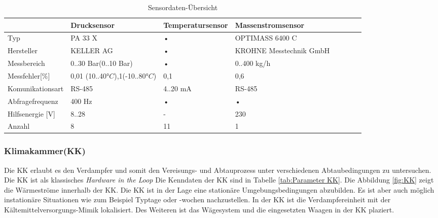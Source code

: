 \begin{table}[htb]
\centering
\caption{Sensordaten-Übersicht}\vspace{6pt}
\label{tab:Messtechnik KA}
\begin{tabular}{p{3cm}p{3cm}p{3cm}p{3.5cm}llll}
\hline 
 & \textbf{Drucksensor} & \textbf{Temperatursensor} & \textbf{Massenstromsensor} \\ 
\hline 
\hline 
Typ & PA 33 X & • & OPTIMASS 6400 C \\ 
\hline 
Hersteller & KELLER AG & • &  KROHNE Messtechnik GmbH \\ 
\hline 
Messbereich & 0..30 Bar(0..10 Bar) & • & 0..400 kg/h \\ 
\hline 
Messfehler[$\%$] & 0,01 (10..40$°C$)\newline 0,1(-10..80$°C$) & 0,1  & 0,6 \\ 
\hline 
Komunikationsart & RS-485 & 4..20 mA & RS-485 \\ 
\hline 
Abfragefrequenz & 400 Hz & • & • \\ 
\hline 
Hilfsenergie [V] & 8..28 & - & 230  \\ 
\hline
Anzahl & 8  & 11 & 1 \\ 
\hline 
\hline 
\end{tabular} 
\label{tab:Tabelle}
\end{table}


\subsubsection{Klimakammer(KK)}
\label{subsec:Klimakammer}
Die KK erlaubt es den Verdampfer und somit den Vereisungs- und Abtauprozess unter verschiedenen Abtaubedingungen zu untersuchen. Die KK ist als klassisches \textit{Hardware in the Loop} Die Kenndaten der KK sind in Tabelle \ref{tab:Parameter KK}. Die Abbildung \ref{fig:KK} zeigt die Wärmeströme innerhalb der KK. Die KK ist in der Lage eine stationäre Umgebungsbedingungen abzubilden. Es ist aber auch möglich instationäre Situationen wie zum Beispiel Typtage oder -wochen nachzustellen. 
In der KK ist die Verdampfereinheit mit der Kältemittelversorgungs-Mimik lokalisiert. Des Weiteren ist das Wägesystem und die eingesetzten Waagen in der KK plaziert. 

